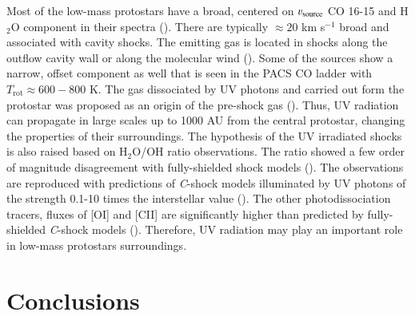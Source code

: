 \documentclass{aa}
\begin{document}
Most of the low-mass protostars have a broad, centered on $\varv_{\mathrm{source}}$ CO 16-15 and
H$_2$O component in their spectra (\citealt{Kri17}). There are typically $\approx 20$ km s$^{-1}$
broad and associated with cavity shocks. The emitting gas is located in shocks along the outflow
cavity wall or along the molecular wind (\citealt{Yva16}). Some of the sources show a
narrow, offset component as well that is seen in the PACS CO ladder with $T_\mathrm{rot} \approx
600-800$ K. The gas dissociated by UV photons and carried out form the protostar was proposed as an
origin of the pre-shock gas (\citealt{Kri17}). Thus, UV radiation can propagate in large
scales up to 1000 AU from the central protostar, changing the properties of their surroundings. The
hypothesis of the UV irradiated shocks is also raised based on H$_2$O/OH ratio observations. The
ratio showed a few order of magnitude disagreement with fully-shielded shock models
(\citealt{Kar14}). The observations are reproduced with predictions of \mbox{\textit{C}-shock} models
illuminated by UV photons of the strength 0.1-10 times the interstellar value (\citealt{Mel15}). The
other photodissociation tracers, fluxes of [OI] and [CII] are significantly higher than predicted by
fully-shielded \mbox{\textit{C}-shock} models (\citealt{Kar18}). Therefore, UV radiation may play
an important role in low-mass protostars surroundings.

\section{Conclusions}
\label{section:conclusions}
\end{document}
